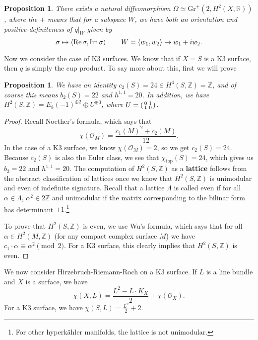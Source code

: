 \documentclass[leqno, openany]{memoir}
\newtheorem{prop}[thm]{Proposition}
\theoremstyle{definition}
\theoremstyle{remark}
\theoremstyle{plain}
\theoremstyle{definition}
\theoremstyle{remark}
\newcommand{\R}{\mathbb{R}}
\newcommand{\Z}{\mathbb{Z}}
\newcommand{\mc}[1]{\mathcal{#1}}
\newcommand{\mr}[1]{\mathrm{#1}}
\begin{document}
\begin{prop}
    There exists a natural diffeomorphism $\Omega \simeq \mr{Gr}^+(2, H^2(X, \R))$, where the $+$ means that for a subspace $W$, we have both an orientation and positive-definiteness of $q |_W$ given by
    \[ \sigma \mapsto \ev{\Re \sigma, \Im \sigma} \qquad W = \ev{w_1, w_2} \mapsto w_1 + i w_2. \]
\end{prop}

Now we consider the case of K3 surfaces. We know that if $X = S$ is a K3 surface, then $q$ is simply the cup product. To say more about this, first we will prove
\begin{prop}
    We have an identity $c_2(S) = 24 \in H^4(S, \Z) = \Z$, and of course this means $b_2(S) = 22$ and $h^{1,1} = 20$. In addition, we have $H^2(S, \Z) = {E_8(-1)}^{\oplus 2} \oplus U^{\oplus 3}$, where $U = \begin{psmallmatrix} 0 & 1 \\ 1 & 0 \end{psmallmatrix}$.
\end{prop}

\begin{proof}
    Recall Noether's formula, which says that
    \[ \chi(\mc{O}_M) = \frac{{c_1(M)}^2 + c_2(M)}{12}. \]
    In the case of a K3 surface, we know $\chi(\mc{O}_M) = 2$, so we get $c_2(S) = 24$. Because $c_2(S)$ is also the Euler class, we see that $\chi_{\mr{top}}(S) = 24$, which gives us $b_2 = 22$ and $h^{1,1} = 20$. The computation of $H^2(S, \Z)$ as a \textbf{lattice} follows from the abstract classification of lattices once we know that $H^2(S, \Z)$ is unimodular and even of indefinite signature. Recall that a lattice $\Lambda$ is called even if for all $\alpha \in \Lambda$, $\alpha^2 \in 2\Z$ and unimodular if the matrix corresponding to the bilinar form has determinant $\pm 1$.\footnote{For other hyperk\"ahler manifolds, the lattice is not unimodular.}

    To prove that $H^2(S, \Z)$ is even, we use Wu's formula, which says that for all $\alpha \in H^2(M, \Z)$ (for any compact complex surface $M$) we have $c_1 \cdot \alpha \equiv \alpha^2 \pmod 2$. For a K3 surface, this clearly implies that $H^2(S, \Z)$ is even.
\end{proof}

We now consider Hirzebruch-Riemann-Roch on a K3 surface. If $L$ is a line bundle and $X$ is a surface, we have
\[ \chi(X, L) = \frac{L^2 - L \cdot K_X}{2} + \chi(\mc{O}_X). \]
For a K3 surface, we have $\chi(S, L) = \frac{L^2}{2} + 2$.
\end{document}

